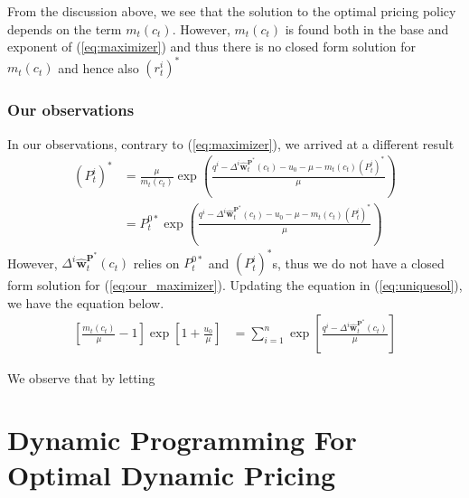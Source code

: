 From the discussion above, we see that the solution to the optimal pricing policy depends on the term $m_t(c_t)$. However, $m_t(c_t)$ is found both in the base and exponent of (\ref{eq:maximizer}) and thus there is no closed form solution for $m_t(c_t)$ and hence also $(r_t^i)^\ast$



\subsubsection{Our observations}

In our observations, contrary to (\ref{eq:maximizer}), we arrived at a different result
\begin{align}
(P_t^i)^\ast &= \frac{\mu}{m_t(c_t)}\exp \left(\frac{q^i-\Delta^i \hat{\mathbf{w}}_t^{\mathbf{P}^\ast}(c_t)-u_0 - \mu- m_t(c_t)(P_t^i)^\ast}{\mu}\right)\nonumber\\
&= P_t^{0\ast}\exp \left(\frac{q^i-\Delta^i \hat{\mathbf{w}}_t^{\mathbf{P}^\ast}(c_t)-u_0 - \mu - m_t(c_t)(P_t^i)^\ast}{\mu}\right)\label{eq:our_maximizer}
\end{align}
%
However,  $\Delta^i \hat{\mathbf{w}}_t^{\mathbf{P}^\ast}(c_t)$ relies on $P_t^{0\ast}$ and $(P_t^i)^\ast$s, thus we do not have a closed form solution for (\ref{eq:our_maximizer}). Updating the equation in (\ref{eq:uniquesol}), we have the equation below.
\begin{align}
\left[\frac{m_t(c_t)}{\mu}-1\right] \exp \left[1+\frac{u_0}{\mu}\right] &= \sum_{i=1}^{n}\exp \left[\frac{q^i-\Delta^i \hat{\mathbf{w}}_t^{\mathbf{P}^\ast}(c_t)}{\mu}\right]\label{eq:our_uniquesol}
\end{align}


We observe that by letting 



\cite{Dong2009}


\section{Dynamic Programming For Optimal Dynamic Pricing}


